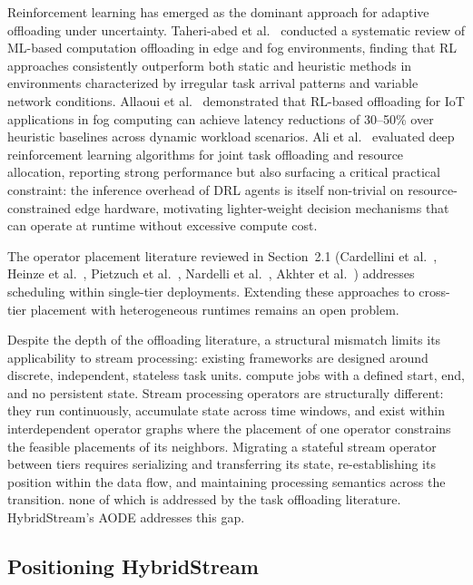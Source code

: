\documentclass[preprint,review,12pt]{elsarticle}
\begin{document}
Reinforcement learning has emerged as the dominant approach for adaptive offloading under uncertainty. Taheri-abed et al.~\cite{taheri2023ml} conducted a systematic review of ML-based computation offloading in edge and fog environments, finding that RL approaches consistently outperform both static and heuristic methods in environments characterized by irregular task arrival patterns and variable network conditions. Allaoui et al.~\cite{allaoui2024rl} demonstrated that RL-based offloading for IoT applications in fog computing can achieve latency reductions of 30--50\% over heuristic baselines across dynamic workload scenarios. Ali et al.~\cite{ali2025drl} evaluated deep reinforcement learning algorithms for joint task offloading and resource allocation, reporting strong performance but also surfacing a critical practical constraint: the inference overhead of DRL agents is itself non-trivial on resource-constrained edge hardware, motivating lighter-weight decision mechanisms that can operate at runtime without excessive compute cost.

The operator placement literature reviewed in Section~2.1 (Cardellini et al.~\cite{cardellini2016optimal,cardellini2018decentralized}, Heinze et al.~\cite{heinze2014elastic}, Pietzuch et al.~\cite{pietzuch2006sbon}, Nardelli et al.~\cite{nardelli2019efficient}, Akhter et al.~\cite{akhter2019stateful}) addresses scheduling within single-tier deployments. Extending these approaches to cross-tier placement with heterogeneous runtimes remains an open problem.

Despite the depth of the offloading literature, a structural mismatch limits its applicability to stream processing: existing frameworks are designed around discrete, independent, stateless task units. compute jobs with a defined start, end, and no persistent state. Stream processing operators are structurally different: they run continuously, accumulate state across time windows, and exist within interdependent operator graphs where the placement of one operator constrains the feasible placements of its neighbors. Migrating a stateful stream operator between tiers requires serializing and transferring its state, re-establishing its position within the data flow, and maintaining processing semantics across the transition. none of which is addressed by the task offloading literature. HybridStream's AODE addresses this gap.

\subsection{Positioning HybridStream}\label{positioning-hybridstream}
\end{document}
